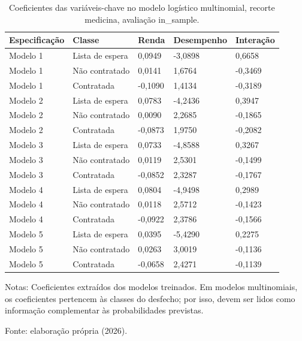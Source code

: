 \begin{table}[htbp]
\centering
\caption{Coeficientes das variáveis-chave no modelo logístico multinomial, recorte medicina, avaliação in\_sample.}
\label{tab:coeficientes_chave_logit_ternario_recorte_medicina_in_sample}
\small
\begin{tabular}{lllll}
\toprule
\rowcolor[gray]{0.85}
Especificação & Classe & Renda & Desempenho & Interação \\
\midrule
Modelo 1 & Lista de espera & 0,0949 & -3,0898 & 0,6658 \\
\rowcolor[gray]{0.95}
Modelo 1 & Não contratado & 0,0141 & 1,6764 & -0,3469 \\
Modelo 1 & Contratada & -0,1090 & 1,4134 & -0,3189 \\
\rowcolor[gray]{0.95}
Modelo 2 & Lista de espera & 0,0783 & -4,2436 & 0,3947 \\
Modelo 2 & Não contratado & 0,0090 & 2,2685 & -0,1865 \\
\rowcolor[gray]{0.95}
Modelo 2 & Contratada & -0,0873 & 1,9750 & -0,2082 \\
Modelo 3 & Lista de espera & 0,0733 & -4,8588 & 0,3267 \\
\rowcolor[gray]{0.95}
Modelo 3 & Não contratado & 0,0119 & 2,5301 & -0,1499 \\
Modelo 3 & Contratada & -0,0852 & 2,3287 & -0,1767 \\
\rowcolor[gray]{0.95}
Modelo 4 & Lista de espera & 0,0804 & -4,9498 & 0,2989 \\
Modelo 4 & Não contratado & 0,0118 & 2,5712 & -0,1423 \\
\rowcolor[gray]{0.95}
Modelo 4 & Contratada & -0,0922 & 2,3786 & -0,1566 \\
Modelo 5 & Lista de espera & 0,0395 & -5,4290 & 0,2275 \\
\rowcolor[gray]{0.95}
Modelo 5 & Não contratado & 0,0263 & 3,0019 & -0,1136 \\
Modelo 5 & Contratada & -0,0658 & 2,4271 & -0,1139 \\
\bottomrule
\end{tabular}
\par\footnotesize{Notas: Coeficientes extraídos dos modelos treinados. Em modelos multinomiais, os coeficientes pertencem às classes do desfecho; por isso, devem ser lidos como informação complementar às probabilidades previstas.}
\par\footnotesize{Fonte: elaboração própria (2026).}
\end{table}
